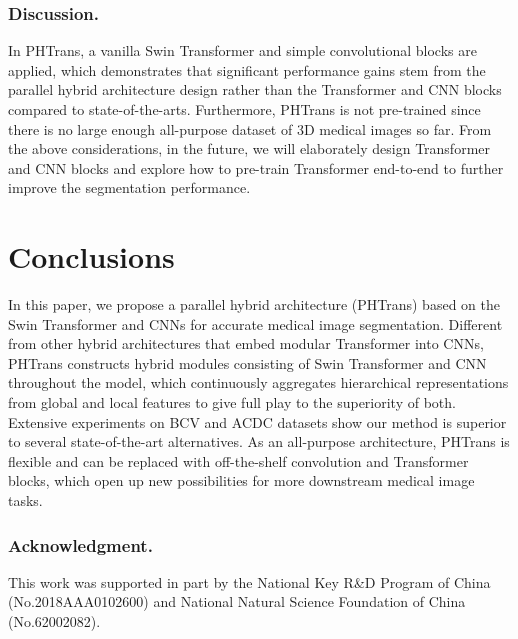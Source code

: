 \documentclass[runningheads]{llncs}
\begin{document}
\subsubsection{Discussion.}

In PHTrans, a vanilla Swin Transformer and simple convolutional blocks are applied, which demonstrates that significant performance gains stem from the parallel hybrid architecture design rather than the Transformer and CNN blocks compared to state-of-the-arts. Furthermore, PHTrans is not pre-trained since there is no large enough all-purpose dataset of 3D medical images so far. From the above considerations, in the future, we will elaborately design Transformer and CNN blocks and explore how to pre-train Transformer end-to-end to further improve the segmentation performance.


\section{Conclusions}
In this paper, we propose a parallel hybrid architecture (PHTrans) based on the Swin Transformer and CNNs for accurate medical image segmentation. Different from other hybrid architectures that embed modular Transformer into CNNs, PHTrans constructs hybrid modules consisting of Swin Transformer and CNN throughout the model, which continuously aggregates hierarchical representations from global and local features to give full play to the superiority of both. Extensive experiments on BCV and ACDC datasets show our method is superior to several state-of-the-art alternatives. As an all-purpose architecture, PHTrans is flexible and can be replaced with off-the-shelf convolution and Transformer blocks, which open up new possibilities for more downstream medical image tasks. 

\subsubsection{Acknowledgment.}This work was supported in part by the National Key R\&D Program of China (No.2018AAA0102600) and National Natural Science Foundation of China (No.62002082).






\end{document}
